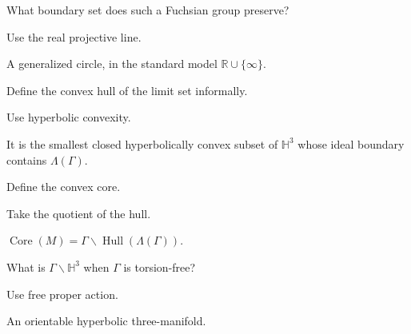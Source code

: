 \begin{exercise}\label{exr:vii37-14}
What boundary set does such a Fuchsian group preserve?
\end{exercise}

\begin{hint}
Use the real projective line.
\end{hint}

\begin{solution}
A generalized circle, in the standard model \(\mathbb R\cup\{\infty\}\).
\end{solution}

\begin{exercise}\label{exr:vii37-15}
Define the convex hull of the limit set informally.
\end{exercise}

\begin{hint}
Use hyperbolic convexity.
\end{hint}

\begin{solution}
It is the smallest closed hyperbolically convex subset of \(\mathbb H^3\) whose ideal boundary contains \(\Lambda(\Gamma)\).
\end{solution}

\begin{exercise}\label{exr:vii37-16}
Define the convex core.
\end{exercise}

\begin{hint}
Take the quotient of the hull.
\end{hint}

\begin{solution}
\(\operatorname{Core}(M)=\Gamma\backslash\operatorname{Hull}(\Lambda(\Gamma))\).
\end{solution}

\begin{exercise}\label{exr:vii37-17}
What is \(\Gamma\backslash\mathbb H^3\) when \(\Gamma\) is torsion-free?
\end{exercise}

\begin{hint}
Use free proper action.
\end{hint}

\begin{solution}
An orientable hyperbolic three-manifold.
\end{solution}

